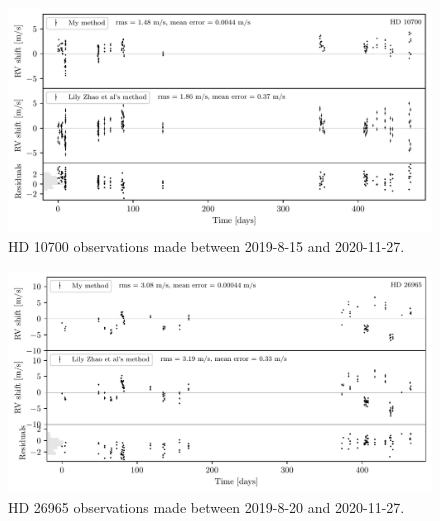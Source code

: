 \begin{figure}%
    \begin{wide}  
    \includegraphics[width=\textwidth]{figures/HD10700_barycentric_rv_vs_lily.pdf}
    \caption{HD 10700 observations made between 2019-8-15 and 2020-11-27.}
    \label{fig:HD10700_rvs}
\end{wide}
\end{figure}

\vspace{-0.75cm}

\begin{figure}%
    \begin{wide}  
    \includegraphics[width=\textwidth]{figures/HD26965_barycentric_rv_vs_lily.pdf}
    \caption{HD 26965 observations made between 2019-8-20 and 2020-11-27.}
    \label{fig:HD26965_rvs}
\end{wide}
\end{figure}
